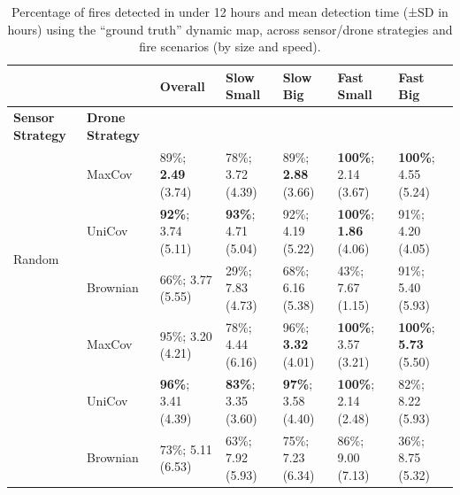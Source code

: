 \begin{table}[htbp]
\centering
\tiny
\begin{tabular}{@{}llp{1.5cm}p{1.5cm}p{1.5cm}p{2cm}p{2cm}@{}}
\toprule
 & & Overall & Slow Small & Slow Big & Fast Small & Fast Big \\
\midrule
\textbf{Sensor Strategy} & \textbf{Drone Strategy} & & & & & \\
\midrule

\multirow{4}{*}{Random} 
  & MaxCov   & 89\%; \textbf{2.49} (3.74) & 78\%; 3.72 (4.39) & 89\%; \textbf{2.88} (3.66) & \textbf{100\%}; 2.14 (3.67) & \textbf{100\%}; 4.55 (5.24) \\
  & UniCov   & \textbf{92\%}; 3.74 (5.11) & \textbf{93\%}; 4.71 (5.04) & 92\%; 4.19 (5.22) & \textbf{100\%}; \textbf{1.86} (4.06) & 91\%; 4.20 (4.05) \\
  & Brownian & 66\%; 3.77 (5.55) & 29\%; 7.83 (4.73) & 68\%; 6.16 (5.38) & 43\%; 7.67 (1.15) & 91\%; 5.40 (5.93) \\
\midrule

\multirow{4}{*}{GaussianCov} 
  & MaxCov   & 95\%; 3.20 (4.21) & 78\%; 4.44 (6.16) & 96\%; \textbf{3.32} (4.01) & \textbf{100\%}; 3.57 (3.21) & \textbf{100\%}; \textbf{5.73} (5.50) \\
  & UniCov   & \textbf{96\%}; 3.41 (4.39) & \textbf{83\%}; 3.35 (3.60) & \textbf{97\%}; 3.58 (4.40) & \textbf{100\%}; 2.14 (2.48) & 82\%; 8.22 (5.93) \\
  & Brownian & 73\%; 5.11 (6.53) & 63\%; 7.92 (5.93) & 75\%; 7.23 (6.34) & 86\%; 9.00 (7.13) & 36\%; 8.75 (5.32) \\

\bottomrule
\end{tabular}
\caption{Percentage of fires detected in under 12 hours and mean detection time (±SD in hours) using the ``ground truth'' dynamic map, across sensor/drone strategies and fire scenarios (by size and speed). }\label{tab:ground_truth}
\end{table}

